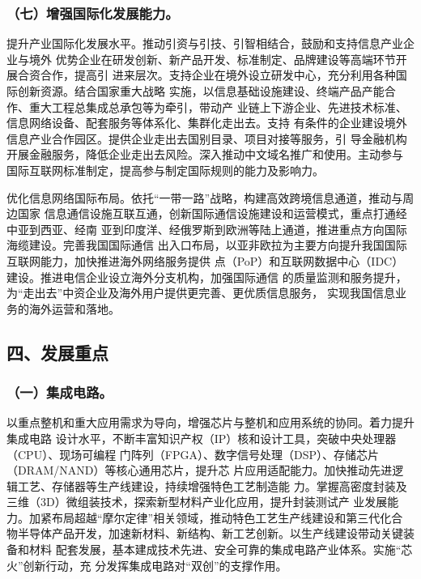 \documentclass[11pt]{ctexart}
\begin{document}
{{{{\subsubsection{（七）增强国际化发展能力。}
\label{sec:org813af3a}

提升产业国际化发展水平。推动引资与引技、引智相结合，鼓励和支持信息产业企业与境外
优势企业在研发创新、新产品开发、标准制定、品牌建设等高端环节开展合资合作，提高引
进来层次。支持企业在境外设立研发中心，充分利用各种国际创新资源。结合国家重大战略
实施，以信息基础设施建设、终端产品产能合作、重大工程总集成总承包等为牵引，带动产
业链上下游企业、先进技术标准、信息网络设备、配套服务等体系化、集群化走出去。支持
有条件的企业建设境外信息产业合作园区。提供企业走出去国别目录、项目对接等服务，引
导金融机构开展金融服务，降低企业走出去风险。深入推动中文域名推广和使用。主动参与
国际互联网标准制定，提高参与制定国际规则的能力及影响力。

优化信息网络国际布局。依托“一带一路”战略，构建高效跨境信息通道，推动与周边国家
信息通信设施互联互通，创新国际通信设施建设和运营模式，重点打通经中亚到西亚、经南
亚到印度洋、经俄罗斯到欧洲等陆上通道，推进重点方向国际海缆建设。完善我国国际通信
出入口布局，以亚非欧拉为主要方向提升我国国际互联网能力，加快推进海外网络服务提供
点（PoP）和互联网数据中心（IDC）建设。推进电信企业设立海外分支机构，加强国际通信
的质量监测和服务提升，为“走出去”中资企业及海外用户提供更完善、更优质信息服务，
实现我国信息业务的海外运营和落地。

\subsection{四、发展重点}
\label{sec:orge373f35}


\subsubsection{（一）集成电路。}
\label{sec:org7d885b1}

以重点整机和重大应用需求为导向，增强芯片与整机和应用系统的协同。着力提升集成电路
设计水平，不断丰富知识产权（IP）核和设计工具，突破中央处理器（CPU）、现场可编程
门阵列（FPGA）、数字信号处理（DSP）、存储芯片（DRAM/NAND）等核心通用芯片，提升芯
片应用适配能力。加快推动先进逻辑工艺、存储器等生产线建设，持续增强特色工艺制造能
力。掌握高密度封装及三维（3D）微组装技术，探索新型材料产业化应用，提升封装测试产
业发展能力。加紧布局超越“摩尔定律”相关领域，推动特色工艺生产线建设和第三代化合
物半导体产品开发，加速新材料、新结构、新工艺创新。以生产线建设带动关键装备和材料
配套发展，基本建成技术先进、安全可靠的集成电路产业体系。实施“芯火”创新行动，充
分发挥集成电路对“双创”的支撑作用。


}}}}
\end{document}
